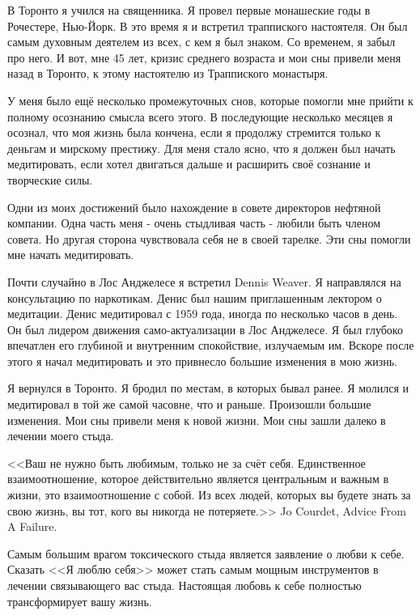 \documentclass[10pt, fleqn]{article}
\begin{document}
В Торонто я учился на священника. Я провел первые монашеские годы в Рочестере, Нью-Йорк. В это время я и встретил траппиского настоятеля. Он был самым духовным деятелем из всех, с кем я был знаком. Со временем, я забыл про него. И вот, мне 45 лет, кризис среднего возраста и мои сны привели меня назад в Торонто, к этому настоятелю из Траппиского монастыря.

У меня было ещё несколько промежуточных снов, которые помогли мне прийти к полному осознанию смысла всего этого. В последующие несколько месяцев я осознал, что моя жизнь была кончена, если я продолжу стремится только к деньгам и мирскому престижу. Для меня стало ясно, что я должен был начать медитировать, если хотел двигаться дальше и расширить своё сознание и творческие силы.

Одни из моих достижений было нахождение в совете директоров нефтяной компании. Одна часть меня - очень стыдливая часть - любили быть членом совета. Но другая сторона чувствовала себя не в своей тарелке. Эти сны помогли мне начать медитировать.

Почти случайно в Лос Анджелесе я встретил Dennis Weaver. Я направлялся на консультацию по наркотикам. Денис был нашим приглашенным лектором о медитации. Денис медитировал с 1959 года, иногда по несколько часов в день. Он был лидером движения само-актуализации в Лос Анджелесе. Я был глубоко впечатлен его глубиной и внутренним спокойствие, излучаемым им. Вскоре после этого я начал медитировать и это привнесло большие изменения в мою жизнь.

Я вернулся в Торонто. Я бродил по местам, в которых бывал ранее. Я молился и медитировал в той же самой часовне, что и раньше. Произошли большие изменения. Мои сны привели меня к новой жизни. Мои сны зашли далеко в лечении моего стыда.



<<Ваш не нужно быть любимым, только не за счёт себя. Единственное взаимоотношение, которое действительно является центральным и важным в жизни, это взаимоотношение с собой. Из всех людей, которых вы будете знать за свою жизнь, вы тот, кого вы никогда не потеряете.>> Jo Courdet, Advice From A Failure.

Самым большим врагом токсического стыда является заявление о любви к себе. Сказать <<Я люблю себя>> может стать самым мощным инструментов в лечении связывающего вас стыда. Настоящая любовь к себе полностью трансформирует вашу жизнь.

\end{document}
